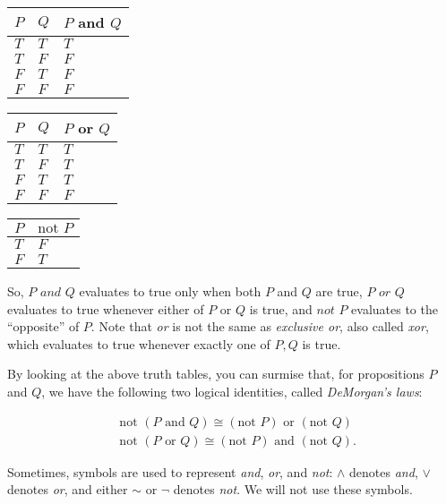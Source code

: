 \begin{table}[H]
    \centering
    \begin{tabular}{|l|l|l|}
    \hline
    $P$ & $Q$ & $P$ and $Q$ \\ \hline
    $T$ & $T$ & $T$        \\ \hline
    $T$ & $F$ & $F$        \\ \hline
    $F$ & $T$ & $F$        \\ \hline
    $F$ & $F$ & $F$        \\ \hline
    \end{tabular}
    \quad
    \begin{tabular}{|l|l|l|}
    \hline
    $P$ & $Q$ & $P$ or $Q$ \\ \hline
    $T$ & $T$ & $T$        \\ \hline
    $T$ & $F$ & $T$        \\ \hline
    $F$ & $T$ & $T$        \\ \hline
    $F$ & $F$ & $F$        \\ \hline
    \end{tabular}
    \quad
    \begin{tabular}{|l|l|}
    \hline
    $P$ & $\text{not } P$ \\ \hline
    $T$ & $F$      \\ \hline
    $F$ & $T$      \\ \hline
    \end{tabular}
\end{table}

So, $P \textit{ and } Q$ evaluates to true only when both $P$ and $Q$ are true, $P \textit{ or } Q$ evaluates to true whenever either of $P$ or $Q$ is true, and $\textit{not } P$ evaluates to the ``opposite'' of $P$. Note that \textit{or} is not the same as \textit{exclusive or}, also called \textit{xor}, which evaluates to true whenever exactly one of $P, Q$ is true.

By looking at the above truth tables, you can surmise that, for propositions $P$ and $Q$, we have the following two logical identities, called \textit{DeMorgan's laws}:

\begin{align*}
    &\text{not }(P \text{ and } Q) \cong (\text{not } P) \text{ or } (\text{not } Q) \\
    &\text{not }(P \text{ or } Q) \cong (\text{not } P) \text{ and } (\text{not } Q).
\end{align*}

Sometimes, symbols are used to represent \textit{and}, \textit{or}, and \textit{not}: $\wedge$ denotes \textit{and}, $\vee$ denotes \textit{or}, and either $\sim$ or $\neg$ denotes \textit{not}. We will not use these symbols.

